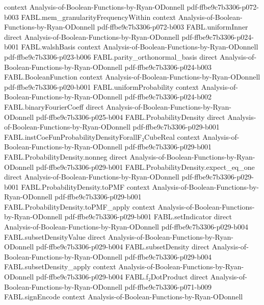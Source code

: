 \begin{theorem}
  {context}
  {Analysis-of-Boolean-Functions-by-Ryan-ODonnell}
  {pdf-ffbe9c7b3306-p072-b003}
\proofstep
  {FABL.mem_granularityFrequencyWithin}
  {context}
  {Analysis-of-Boolean-Functions-by-Ryan-ODonnell}
  {pdf-ffbe9c7b3306-p072-b003}
\proofstep
  {FABL.uniformInner}
  {direct}
  {Analysis-of-Boolean-Functions-by-Ryan-ODonnell}
  {pdf-ffbe9c7b3306-p024-b001}
\proofstep
  {FABL.walshBasis}
  {context}
  {Analysis-of-Boolean-Functions-by-Ryan-ODonnell}
  {pdf-ffbe9c7b3306-p023-b006}
\proofstep
  {FABL.parity_orthonormal_basis}
  {direct}
  {Analysis-of-Boolean-Functions-by-Ryan-ODonnell}
  {pdf-ffbe9c7b3306-p024-b003}
\proofstep
  {FABL.BooleanFunction}
  {context}
  {Analysis-of-Boolean-Functions-by-Ryan-ODonnell}
  {pdf-ffbe9c7b3306-p020-b001}
\proofstep
  {FABL.uniformProbability}
  {context}
  {Analysis-of-Boolean-Functions-by-Ryan-ODonnell}
  {pdf-ffbe9c7b3306-p024-b002}
\proofstep
  {FABL.binaryFourierCoeff}
  {direct}
  {Analysis-of-Boolean-Functions-by-Ryan-ODonnell}
  {pdf-ffbe9c7b3306-p025-b004}
\proofstep
  {FABL.ProbabilityDensity}
  {direct}
  {Analysis-of-Boolean-Functions-by-Ryan-ODonnell}
  {pdf-ffbe9c7b3306-p029-b001}
\proofstep
  {FABL.instCoeFunProbabilityDensityForallF₂CubeReal}
  {context}
  {Analysis-of-Boolean-Functions-by-Ryan-ODonnell}
  {pdf-ffbe9c7b3306-p029-b001}
\proofstep
  {FABL.ProbabilityDensity.nonneg}
  {direct}
  {Analysis-of-Boolean-Functions-by-Ryan-ODonnell}
  {pdf-ffbe9c7b3306-p029-b001}
\proofstep
  {FABL.ProbabilityDensity.expect_eq_one}
  {direct}
  {Analysis-of-Boolean-Functions-by-Ryan-ODonnell}
  {pdf-ffbe9c7b3306-p029-b001}
\proofstep
  {FABL.ProbabilityDensity.toPMF}
  {context}
  {Analysis-of-Boolean-Functions-by-Ryan-ODonnell}
  {pdf-ffbe9c7b3306-p029-b001}
\proofstep
  {FABL.ProbabilityDensity.toPMF_apply}
  {context}
  {Analysis-of-Boolean-Functions-by-Ryan-ODonnell}
  {pdf-ffbe9c7b3306-p029-b001}
\proofstep
  {FABL.setIndicator}
  {direct}
  {Analysis-of-Boolean-Functions-by-Ryan-ODonnell}
  {pdf-ffbe9c7b3306-p029-b004}
\proofstep
  {FABL.subsetDensityValue}
  {direct}
  {Analysis-of-Boolean-Functions-by-Ryan-ODonnell}
  {pdf-ffbe9c7b3306-p029-b004}
\proofstep
  {FABL.subsetDensity}
  {direct}
  {Analysis-of-Boolean-Functions-by-Ryan-ODonnell}
  {pdf-ffbe9c7b3306-p029-b004}
\proofstep
  {FABL.subsetDensity_apply}
  {context}
  {Analysis-of-Boolean-Functions-by-Ryan-ODonnell}
  {pdf-ffbe9c7b3306-p029-b004}
\proofstep
  {FABL.f₂DotProduct}
  {direct}
  {Analysis-of-Boolean-Functions-by-Ryan-ODonnell}
  {pdf-ffbe9c7b3306-p071-b009}
\proofstep
  {FABL.signEncode}
  {context}
  {Analysis-of-Boolean-Functions-by-Ryan-ODonnell}

\end{theorem}
